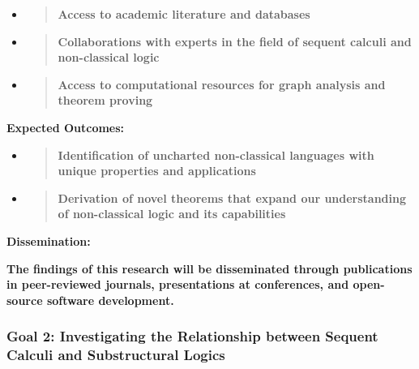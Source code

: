 \begin{itemize}
\item
  \begin{quote}
  \textbf{Access to academic literature and databases\\
  }
  \end{quote}
\item
  \begin{quote}
  \textbf{Collaborations with experts in the field of sequent calculi
  and non-classical logic\\
  }
  \end{quote}
\item
  \begin{quote}
  \textbf{Access to computational resources for graph analysis and
  theorem proving\\
  }
  \end{quote}
\end{itemize}

\textbf{Expected Outcomes:}

\begin{itemize}
\item
  \begin{quote}
  \textbf{Identification of uncharted non-classical languages with
  unique properties and applications\\
  }
  \end{quote}
\item
  \begin{quote}
  \textbf{Derivation of novel theorems that expand our understanding of
  non-classical logic and its capabilities\\
  }
  \end{quote}
\end{itemize}

\textbf{Dissemination:}

\textbf{The findings of this research will be disseminated through
publications in peer-reviewed journals, presentations at conferences,
and open-source software development.}

\hypertarget{goal-2-investigating-the-relationship-between-sequent-calculi-and-substructural-logics}{%
\subsubsection{Goal 2: Investigating the Relationship between Sequent
Calculi and Substructural
Logics}\label{goal-2-investigating-the-relationship-between-sequent-calculi-and-substructural-logics}}

